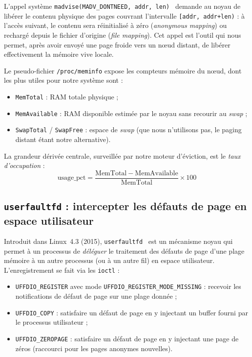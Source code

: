 L'appel système \texttt{madvise(MADV\_DONTNEED, addr, len)}~\cite{madvise_man} demande au noyau de libérer le contenu physique des pages couvrant l'intervalle \texttt{[addr, addr+len)} : à l'accès suivant, le contenu sera réinitialisé à zéro (\emph{anonymous mapping}) ou rechargé depuis le fichier d'origine (\emph{file mapping}). Cet appel est l'outil qui nous permet, après avoir envoyé une page froide vers un nœud distant, de libérer effectivement la mémoire vive locale.

Le pseudo-fichier \texttt{/proc/meminfo} expose les compteurs mémoire du nœud, dont les plus utiles pour notre système sont :

\begin{itemize}[leftmargin=*]
    \item \texttt{MemTotal} : RAM totale physique ;
    \item \texttt{MemAvailable} : RAM disponible estimée par le noyau sans recourir au \emph{swap} ;
    \item \texttt{SwapTotal} / \texttt{SwapFree} : espace de \emph{swap} (que nous n'utilisons pas, le paging distant étant notre alternative).
\end{itemize}

La grandeur dérivée centrale, surveillée par notre moteur d'éviction, est le \emph{taux d'occupation} :
$$\mathrm{usage\_pct} = \frac{\mathrm{MemTotal} - \mathrm{MemAvailable}}{\mathrm{MemTotal}} \times 100$$

\subsection{\texttt{userfaultfd} : intercepter les défauts de page en espace utilisateur}

Introduit dans Linux~4.3 (2015), \texttt{userfaultfd}~\cite{userfaultfd_man} est un mécanisme noyau qui permet à un processus de \emph{déléguer} le traitement des défauts de page d'une plage mémoire à un autre processus (ou à un autre fil) en espace utilisateur. L'enregistrement se fait via les \texttt{ioctl} :
\begin{itemize}[leftmargin=*]
    \item \texttt{UFFDIO\_REGISTER} avec mode \texttt{UFFDIO\_REGISTER\_MODE\_MISSING} : recevoir les notifications de défaut de page sur une plage donnée ;
    \item \texttt{UFFDIO\_COPY} : satisfaire un défaut de page en y injectant un buffer fourni par le processus utilisateur ;
    \item \texttt{UFFDIO\_ZEROPAGE} : satisfaire un défaut de page en y injectant une page de zéros (raccourci pour les pages anonymes nouvelles).
\end{itemize}

